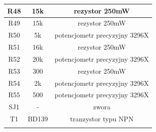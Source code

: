 \documentclass[12pt]{article}
\begin{document}
\begin{minipage}[t]{0.45\linewidth}
\begin{tabular}{|c|c|c|}
\hline
R48 & 15k & rezystor 250mW \\
\hline
R49 & 15k & rezystor 250mW \\
\hline
R50 & 5k & potencjometr precyzyjny 3296X \\
\hline
R51 & 16k & rezystor 250mW \\
\hline
R52 & 20k & potencjometr precyzyjny 3296X \\
\hline
R53 & 300 & rezystor 250mW \\
\hline
R54 & 2k & potencjometr precyzyjny 3296X \\
\hline
R55 & 500 & potencjometr precyzyjny 3296X \\
\hline
SJ1 & - & zwora \\
\hline
T1 & BD139 & tranzystor typu NPN \\
\hline
 &  &  \\
\hline
\end{tabular}
\end{minipage}
\end{document}
